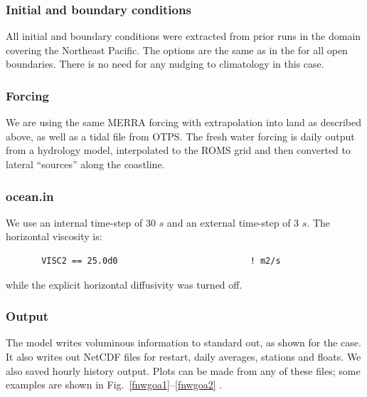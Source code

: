 \subsubsection{Initial and boundary conditions}
All initial and boundary conditions were extracted from prior runs
in the  domain covering the Northeast Pacific. The
 options are the same as in the  for all
open boundaries. There is no need for any nudging to climatology
in this case.

\subsubsection{Forcing}
We are using the same MERRA forcing with extrapolation into land as
described above, as well as a tidal file from OTPS. The fresh water
forcing is daily output from a hydrology model, interpolated to the
ROMS grid and then converted to lateral ``sources'' along the
coastline.

\subsubsection{ocean.in}
We use an internal time-step of 30 $s$ and an external time-step of
3 $s$. The horizontal viscosity is:
\begin{verbatim}
       VISC2 == 25.0d0                          ! m2/s
\end{verbatim}
while the explicit horizontal diffusivity was turned off.

\subsubsection{Output}
The model writes voluminous information to standard out, as shown
for the  case. It also writes out NetCDF files for
restart, daily averages, stations and floats. We also saved hourly
history output. Plots can be made from any of these files; some
examples are shown in Fig.\ \ref{fnwgoa1}--\ref{fnwgoa2} .

